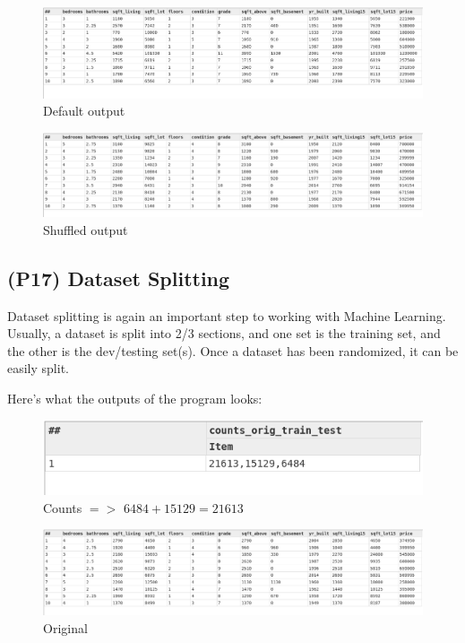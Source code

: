 \documentclass[a4paper,oneside,12pt]{book}
\begin{document}
\begin{figure}[h]
    \centering
    \includegraphics[width=\linewidth]{../output/54/default}
    \caption{Default output}
\end{figure}
\begin{figure}[h]
    \centering
    \includegraphics[width=\linewidth]{../output/54/shuffled}
    \caption{Shuffled output}
\end{figure}


\subsection[Dataset Splitting]{(P17) Dataset Splitting}

Dataset splitting is again an important step to working with Machine Learning. Usually, a dataset is split into 2/3 sections, and one set is the training set, and the other is the dev/testing set(s). Once a dataset has been randomized, it can be easily split.



Here's what the outputs of the program looks:

\begin{figure}[h]
    \centering
    \includegraphics[width=.7\linewidth]{../output/55/counts}
    \caption{Counts $=>$ $6484+15129=21613$}
\end{figure}

\begin{figure}[h]
    \centering
    \includegraphics[width=\linewidth]{../output/55/original}
    \caption{Original}
\end{figure}
\end{document}
